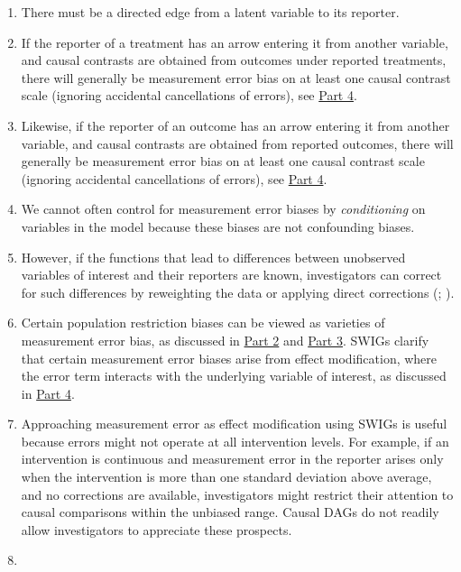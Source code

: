 \documentclass[
  single column]{article}
\providecommand{\tightlist}{%
  \setlength{\itemsep}{0pt}\setlength{\parskip}{0pt}}\usepackage{longtable,booktabs,array}
\begin{document}
\begin{enumerate}
\def\labelenumi{\arabic{enumi}.}
\tightlist
\item
  There must be a directed edge from a latent variable to its reporter.
\item
  If the reporter of a treatment has an arrow entering it from another
  variable, and causal contrasts are obtained from outcomes under
  reported treatments, there will generally be measurement error bias on
  at least one causal contrast scale (ignoring accidental cancellations
  of errors), see \hyperref[id-sec-4]{Part 4}.
\item
  Likewise, if the reporter of an outcome has an arrow entering it from
  another variable, and causal contrasts are obtained from reported
  outcomes, there will generally be measurement error bias on at least
  one causal contrast scale (ignoring accidental cancellations of
  errors), see \hyperref[id-sec-4]{Part 4}.
\item
  We cannot often control for measurement error biases by
  \emph{conditioning} on variables in the model because these biases are
  not confounding biases.
\item
  However, if the functions that lead to differences between unobserved
  variables of interest and their reporters are known, investigators can
  correct for such differences by reweighting the data or applying
  direct corrections (; ).
\item
  Certain population restriction biases can be viewed as varieties of
  measurement error bias, as discussed in \hyperref[id-sec-2]{Part 2}
  and \hyperref[id-sec-3]{Part 3}. SWIGs clarify that certain
  measurement error biases arise from effect modification, where the
  error term interacts with the underlying variable of interest, as
  discussed in \hyperref[id-sec-4]{Part 4}.
\item
  Approaching measurement error as effect modification using SWIGs is
  useful because errors might not operate at all intervention levels.
  For example, if an intervention is continuous and measurement error in
  the reporter arises only when the intervention is more than one
  standard deviation above average, and no corrections are available,
  investigators might restrict their attention to causal comparisons
  within the unbiased range. Causal DAGs do not readily allow
  investigators to appreciate these prospects.
\item

\end{enumerate}
\end{document}
